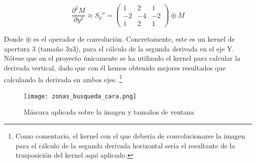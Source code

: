 \[ \frac{\partial^{2}{M}}{\partial{y^{2}}} \approx S_{y}''= \left( \begin{array}{ccc} 1 & 2 & 1 \\ -2 & -4 & -2 \\ 1 & 2 & 1  \end{array} \right) \oplus M \]

Donde $\oplus$ es el operador de convolución. Concretamente, este es un kernel de apertura 3 (tamaño 3x3), para el cálculo de la segunda derivada en el eje Y. Nótese que en el proyecto únicamente se ha utilizado el kernel para calcular la derivada vertical, dado que con él hemos obtenido mejores resultados que calculando la derivada en ambos ejes. \footnote{Como comentario, el kernel con el que debería de convolucionarse la imagen para el cálculo de la segunda derivada horizontal sería el resultante de la trasposición del kernel aquí aplicado.}

\begin{figure}[h!]
	\centering
	\texttt{[image: zonas\_busqueda\_cara.png]}
	\caption{Máscara aplicada sobre la imagen y tamaños de ventana}
	\label{fig:imagen_mascaras}
\end{figure}

